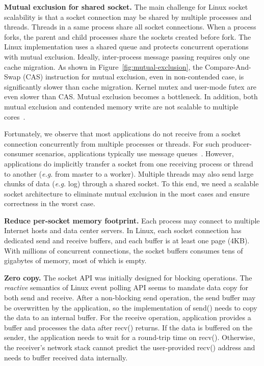 \textbf{Mutual exclusion for shared socket.}
The main challenge for Linux socket scalability is that a socket connection may be shared by multiple processes and threads. Threads in a same process share all socket connections. When a process forks, the parent and child processes share the sockets created before fork. The Linux implementation uses a shared queue and protects concurrent operations with mutual exclusion.
Ideally, inter-process message passing requires only one cache migration. As shown in Figure~\ref{fig:mutual-exclusion}, the Compare-And-Swap (CAS) instruction for mutual exclusion, even in non-contended case, is significantly slower than cache migration. Kernel mutex and user-mode futex are even slower than CAS. Mutual exclusion becomes a bottleneck. In addition, both mutual exclusion and contended memory write are not scalable to multiple cores~\cite{boyd2014optimizing}.

Fortunately, we observe that most applications do not receive from a socket connection concurrently from multiple processes or threads. For such producer-consumer scenarios, applications typically use message queues~\cite{hintjens2013zeromq}. However, applications do implicitly transfer a socket from one receiving process or thread to another (\textit{e.g.} from master to a worker). Multiple threads may also send large chunks of data (\textit{e.g.} log) through a shared socket.
To this end, we need a scalable socket architecture to eliminate mutual exclusion in the most cases and ensure correctness in the worst case.


\textbf{Reduce per-socket memory footprint.}
Each process may connect to multiple Internet hosts and data center servers. In Linux, each socket connection has dedicated send and receive buffers, and each buffer is at least one page (4KB). With millions of concurrent connections, the socket buffers consumes tens of gigabytes of memory, most of which is empty.



\textbf{Zero copy.}
The socket API was initially designed for blocking operations. The \textit{reactive} semantics of Linux event polling API seems to mandate data copy for both send and receive. After a non-blocking send operation, the send buffer may be overwritten by the application, so the implementation of send() needs to copy the data to an internal buffer. For the receive operation, application provides a buffer and processes the data after recv() returns. If the data is buffered on the sender, the application needs to wait for a round-trip time on recv(). Otherwise, the receiver's network stack cannot predict the user-provided recv() address and needs to buffer received data internally.

